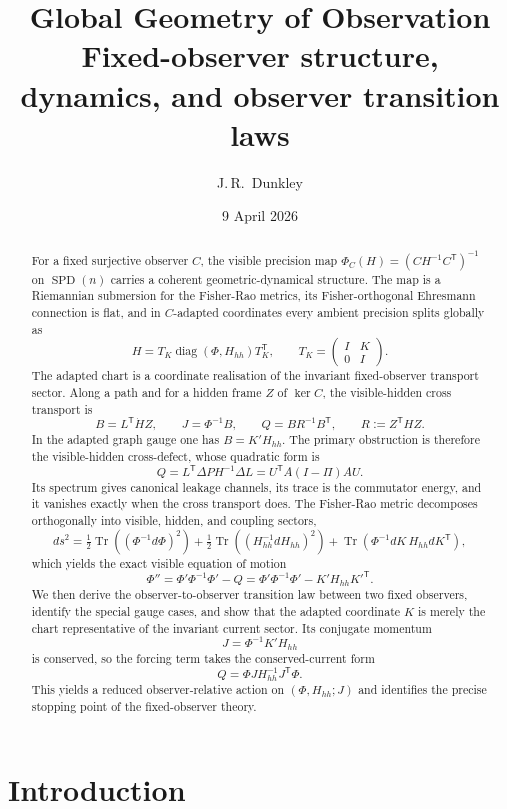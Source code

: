 \documentclass[11pt,a4paper]{article}
\title{\textbf{Global Geometry of Observation\\
\large{Fixed-observer structure, dynamics, and observer transition laws}}}
\author{J.\,R.~Dunkley}
\date{9 April 2026}
\numberwithin{equation}{section}
\DeclareMathOperator{\Tr}{Tr}
\DeclareMathOperator{\SPD}{SPD}
\DeclareMathOperator{\diag}{diag}
\theoremstyle{thmcompact}
\theoremstyle{remark}
\begin{document}
\maketitle

\begin{abstract}
For a fixed surjective observer $C$, the visible precision map $\Phi_C(H)=(CH^{-1}C^{\mathsf T})^{-1}$ on $\SPD(n)$ carries a coherent geometric-dynamical structure. The map is a Riemannian submersion for the Fisher-Rao metrics, its Fisher-orthogonal Ehresmann connection is flat, and in $C$-adapted coordinates every ambient precision splits globally as
\[
H=T_K\diag(\Phi,H_{hh})T_K^{\mathsf T},
\qquad
T_K=\begin{pmatrix}I&K\\0&I\end{pmatrix}.
\]
The adapted chart is a coordinate realisation of the invariant fixed-observer transport sector. Along a path and for a hidden frame $Z$ of $\ker C$, the visible-hidden cross transport is
\[
B=L^{\mathsf T}\dot H Z,
\qquad
J=\Phi^{-1}B,
\qquad
Q=BR^{-1}B^{\mathsf T},
\qquad
R:=Z^{\mathsf T}HZ.
\]
In the adapted graph gauge one has $B=K'H_{hh}$. The primary obstruction is therefore the visible-hidden cross-defect, whose quadratic form is
\[
Q=L^{\mathsf T}\Delta P H^{-1}\Delta L=U^{\mathsf T}A(I-\Pi)AU.
\]
Its spectrum gives canonical leakage channels, its trace is the commutator energy, and it vanishes exactly when the cross transport does. The Fisher-Rao metric decomposes orthogonally into visible, hidden, and coupling sectors,
\[
ds^2=\tfrac12\Tr((\Phi^{-1}d\Phi)^2)+\tfrac12\Tr((H_{hh}^{-1}dH_{hh})^2)+\Tr(\Phi^{-1}dK\,H_{hh}dK^{\mathsf T}),
\]
which yields the exact visible equation of motion
\[
\Phi''=\Phi'\Phi^{-1}\Phi'-Q=\Phi'\Phi^{-1}\Phi'-K'H_{hh}K'^{\mathsf T}.
\]
We then derive the observer-to-observer transition law between two fixed observers, identify the special gauge cases, and show that the adapted coordinate $K$ is merely the chart representative of the invariant current sector. Its conjugate momentum
\[
J=\Phi^{-1}K'H_{hh}
\]
is conserved, so the forcing term takes the conserved-current form
\[
Q=\Phi J H_{hh}^{-1}J^{\mathsf T}\Phi.
\]
This yields a reduced observer-relative action on $(\Phi,H_{hh};J)$ and identifies the precise stopping point of the fixed-observer theory.
\end{abstract}

\section{Introduction}
\end{document}
